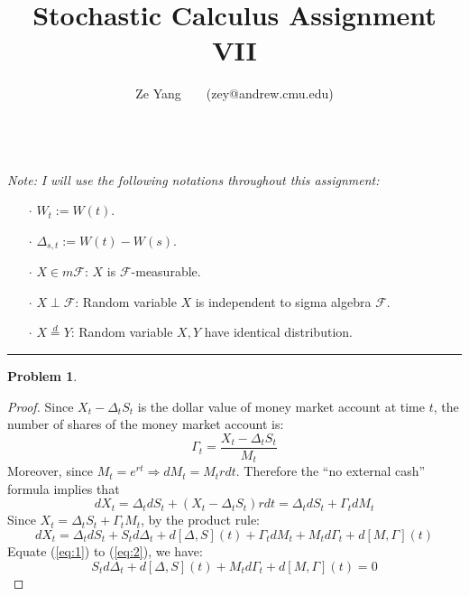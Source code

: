 \documentclass[a4paper, 10pt]{article}
\title{\textbf{Stochastic Calculus Assignment VII}}
\author{Ze Yang~~~~(zey@andrew.cmu.edu)}
\theoremstyle{definition}
\newtheorem{problem}{Problem}
\theoremstyle{hSol}
\begin{document}
\maketitle

~\\
\textit{Note:} \textit{I will use the following notations throughout this assignment:}
\begin{itemize}
	\item[$\cdot$] $W_t := W(t)$.
	\item[$\cdot$] $\Delta_{s,t} := W(t) - W(s)$.
	\item[$\cdot$] $X\in m \mathcal{F}$: $X$ is $\mathcal{F}$-measurable.
	\item[$\cdot$] $X\perp \mathcal{F}$: Random variable $X$ is independent to sigma algebra $\mathcal{F}$. 
	\item[$\cdot$] $X\stackrel{d}{=} Y$: Random variable $X,Y$ have identical distribution.
\end{itemize}

\noindent\rule{16cm}{0.4pt}
\begin{problem}
\end{problem}
\begin{proof} 
Since $X_t - \Delta_t S_t$ is the dollar value of money market account at time $t$, the number of shares of the money market account is:
$$
\Gamma_t = \frac{X_t - \Delta_t S_t}{M_t}
$$
Moreover, since $M_t = e^{rt} \Rightarrow dM_t = M_t rdt$. Therefore the ``no external cash'' formula implies that
\begin{equation}\label{eq:1}
	dX_t = \Delta_t dS_t + (X_t - \Delta_t S_t )rdt = \Delta_t dS_t + \Gamma_t dM_t
\end{equation}
Since $X_t = \Delta_t S_t + \Gamma_t M_t$, by the product rule:
\begin{equation}\label{eq:2}
	dX_t = \Delta_t dS_t + S_t d\Delta_t + d[\Delta, S](t) +\Gamma_t dM_t + M_t d\Gamma_t + d[M, \Gamma](t)
\end{equation}
Equate (\ref{eq:1}) to (\ref{eq:2}), we have:
\begin{equation}
	S_t d\Delta_t + d[\Delta, S](t) + M_t d\Gamma_t + d[M, \Gamma](t) = 0
\end{equation}

\end{proof}
\end{document}
